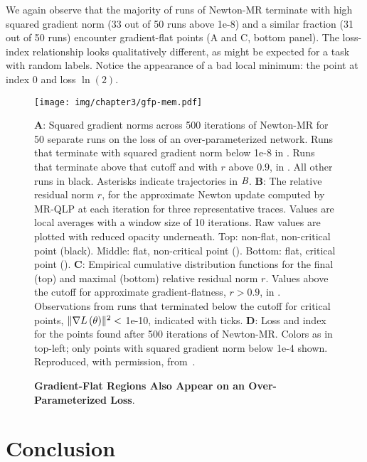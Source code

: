 \documentclass[../../thesis.tex]{subfiles}
\begin{document}
We again observe that the majority of runs of Newton-MR
terminate with high squared gradient norm
(33 out of 50 runs above 1e-8)
and a similar fraction
(31 out of 50 runs)
encounter gradient-flat points
(A and C, bottom panel).
The loss-index relationship looks qualitatively different,
as might be expected for a task with random labels.
Notice the appearance of a bad local minimum:
the \successcolor{} point at index 0 and loss $\ln(2)$.

\begin{figure}[!hp]
	\begin{center}
		\texttt{[image: img/chapter3/gfp-mem.pdf]}
	\end{center}
	\caption{\textbf{Gradient-Flat Regions Also Appear on an Over-Parameterized Loss}.}{%
	\textbf{A}:
	Squared gradient norms across 500 iterations of Newton-MR
	for 50 separate runs on the loss of an over-parameterized network.
	Runs that terminate with squared gradient norm below 1e-8
	in \successcolor{}.
	Runs that terminate above that cutoff and with $r$ above $0.9$,
	in \failcolor{}.
	All other runs in black.
	Asterisks indicate trajectories in $\emph{B}$.
	\textbf{B}:
	The relative residual norm $r$,
	for the approximate Newton update
	computed by MR-QLP at each iteration
	for three representative traces.
	Values are local averages with a window size of 10 iterations.
	Raw values are plotted with reduced opacity underneath.
	Top: non-flat, non-critical point (black).
	Middle: flat, non-critical point (\failcolor{}).
	Bottom: flat, critical point (\successcolor{}).
	\textbf{C}:
	Empirical cumulative distribution functions for
	the final (top) and maximal (bottom) relative residual norm $r$.
	Values above the cutoff for approximate gradient-flatness, $r>0.9$,
	in \failcolor{}.
	Observations from runs that terminated below the cutoff for critical points,
	$\lVert\nabla L\left(\theta\right)\rVert^2 <$ 1e-10,
	indicated with \successcolor{} ticks.
	\textbf{D}:
	Loss and index for the points found
	after 500 iterations of Newton-MR\@.
	Colors as in top-left; only points with squared gradient norm below 1e-4 shown.
	Reproduced, with permission, from~\cite{frye2020}.%
	}
\end{figure}


\section{Conclusion}%
\end{document}
